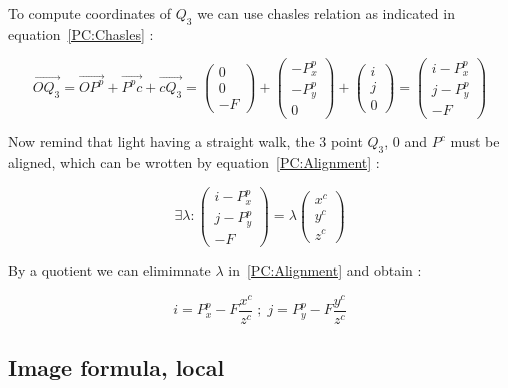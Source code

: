 To compute coordinates of $Q_3$ we can use chasles relation as indicated in equation~\ref{PC:Chasles} :

\begin{equation}
	\overrightarrow{OQ_3} =  \overrightarrow{O P^p} + \overrightarrow{P^p c} +  \overrightarrow{c Q_3}
	 =     \begin{pmatrix} 0\\0\\-F \end{pmatrix}
             + \begin{pmatrix} -P^p_x\\-P^p_y\\0 \end{pmatrix}
             + \begin{pmatrix} i\\j\\0 \end{pmatrix}
	 =     \begin{pmatrix} i-P^p_x\\j-P^p_y\\-F \end{pmatrix}
	\label{PC:Chasles}
\end{equation}

Now remind that light having a straight walk, the $3$ point $Q_3$, $0$ and $P^c$ must be aligned,
which can be wrotten by equation~\ref{PC:Alignment} :

\begin{equation}
	\exists \lambda : 
	\begin{pmatrix} i-P^p_x\\j-P^p_y\\-F \end{pmatrix} 
      = \lambda   \begin{pmatrix} x^c\\y^c\\z^c \end{pmatrix}
		\label{PC:Alignment}
\end{equation}

By a quotient  we can elimimnate $\lambda$ in~\ref{PC:Alignment} and obtain :


\begin{equation}
	i = P^p_x -F \frac{x^c}{z^c}  \; ; \;
	j = P^p_y -F \frac{y^c}{z^c}  
	\label{PC:FormulaImaIntr1}
\end{equation}

\subsection{Image formula, local}

